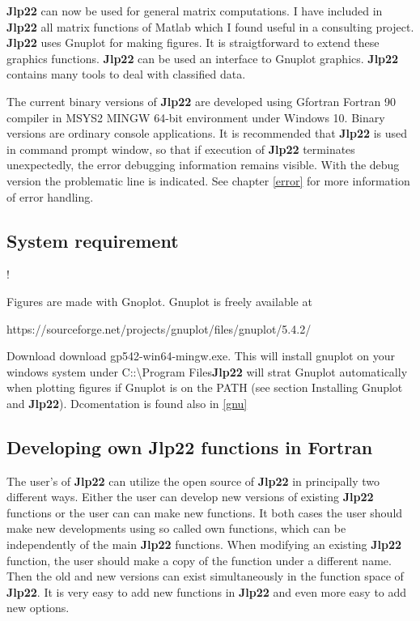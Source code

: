 \textbf{Jlp22} can now be used for general matrix computations. I have included in \textbf{Jlp22} all matrix functions of 
Matlab which I found useful in a consulting project. \textbf{Jlp22} uses Gnuplot for making figures. 
It is straigtforward to extend these graphics functions. \textbf{Jlp22} can be used an 
interface to Gnuplot graphics.  \textbf{Jlp22} contains many tools to deal with classified data. 
 
The current binary versions of \textbf{Jlp22} are developed using Gfortran Fortran 90 compiler in MSYS2 MINGW 64-bit environment 
under Windows 10. 
Binary versions are ordinary console applications. It is recommended that \textbf{Jlp22} is used in command 
prompt window, so that 
if execution of \textbf{Jlp22} terminates unexpectedly, the error debugging information remains visible. 
With the debug version the problematic line is indicated. 
See chapter \ref{error} for more information of error handling. 
 
 
\subsection{System requirement} 
\label{system} 
! 
 
 
Figures are made with Gnoplot. 
Gnuplot is freely available at 
 
 
https://sourceforge.net/projects/gnuplot/files/gnuplot/5.4.2/ 
 
Download  download gp542-win64-mingw.exe. This will install gnuplot on your windows 
system under C::\textbackslash Program Files\gnuplot\. \textbf{Jlp22} will strat Gnuplot automatically when 
plotting figures if Gnuplot is on the PATH (see section Installing Gnuplot and \textbf{Jlp22}). 
Dcomentation is found also in \ref{gnu} 
 
\subsection{Developing own \textbf{Jlp22} functions in Fortran} 
\label{intro2} 
The user's of \textbf{Jlp22} can utilize the open source of \textbf{Jlp22} in principally two different ways. 
Either the user can develop new versions of existing \textbf{Jlp22} functions or the user can can make new functions. 
It both cases the user should make new developments using so called own functions, which can 
be independently of the main \textbf{Jlp22} functions. When modifying an existing \textbf{Jlp22} function, the user should make a copy of the 
function under a different name. Then the old and new versions 
can exist simultaneously in the function 
space of \textbf{Jlp22}. It is very easy to add new functions in \textbf{Jlp22} and even more easy to add new options. 
 
